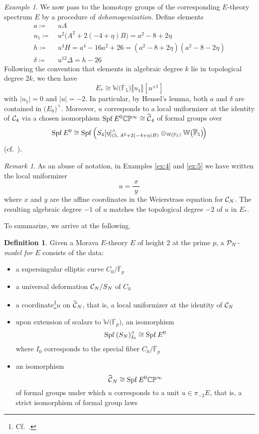 \documentclass{gtpart}
\theoremstyle{definition}
\newtheorem{defn}[equation]{Definition}
\theoremstyle{remark}
\newtheorem{rmk}[equation]{Remark}
\newtheorem{ex}[equation]{Example}
\newcommand{\mb}[1]{\mathbb{#1}}
\newcommand{\Spf}{{\rm Spf\thinspace}}
\newcommand{\cF}{\overline {\mb F}}
\newcommand{\CC}{{\cal C}}
\newcommand{\CP}{{\cal P}}
\newcommand{\BC}{{\mb C}}
\newcommand{\BF}{{\mb F}}
\newcommand{\BP}{{\mb P}}
\newcommand{\BW}{{\mb W}}
\newcommand{\HCC}{\widehat{~\!\!\CC}}
\renewcommand{\D}{\Delta}
\renewcommand{\d}{\delta}
\newcommand{\ce}{\coloneqq}
\newcommand{\lb}{\llbracket}
\newcommand{\rb}{\rrbracket}
\renewcommand{\=}{\approx}
\renewcommand{\-}{\sim}
\numberwithin{equation}{section}
\begin{document}
\begin{ex}
 We now pass to the homotopy groups of the corresponding $E$-theory spectrum $E$ 
 by a procedure of {\em dehomogenization}.  Define elements 
 \[
  \begin{split}
   a \ce & ~ u A \\
   u_1 \ce & ~ u^2 \big(A^2 + 2(-4 + \eta) B\big) = a^2 - 8 + 2 \eta \\
   h \ce & ~ u^4 H = a^4 - 16 a^2 + 26 
                   = (a^2 - 8 + 2 \eta) (a^2 - 8 - 2 \eta) \\
   \d \ce & ~ u^{12} \D = h - 26 
  \end{split}
 \]
 Following the convention that elements in algebraic degree $k$ lie in 
 topological degree $2 k$, we then have 
 \[
  E_* \cong \BW \big( \cF_5 \big) \lb u_1 \rb [u^{\pm 1}] 
 \]
 with $|u_1| = 0$ and $|u| = -2$.  In particular, by Hensel's lemma, both $a$ 
 and $\d$ are contained in $\big( E_0 \big)^{\!\times}$.  Moreover, $u$ 
 corresponds to a local uniformizer at the identity of $\CC_4$ via a chosen 
 isomorphism $\Spf E^0 \BC\BP^\infty \cong \HCC_4$ of formal groups over 
 \[
  \Spf E^0 \cong 
  \Spf\!\left( S_4[\eta]^\wedge_{\left(5, \, A^2 + 2 (-4 + \eta) B\right)} 
  \otimes_{\BW(\BF_5)} \BW \big( \cF_5 \big) \!\right) 
 \]
 (cf.~\cite[Definition 1.2]{AHS01}).  
\end{ex}

\begin{rmk}
 \label{rmk:abuse}
 As an abuse of notation, in Examples \ref{ex:4} and \ref{ex:5} we have written 
 the local uniformizer 
 \[
  u = \frac{~\!x~\!}{y} 
 \]
 where $x$ and $y$ are the affine coordinates in the Weierstrass equation for 
 $\CC_N$.  The resulting algebraic degree $-1$ of $u$ matches the topological 
 degree $-2$ of $u$ in $E_*$.  
\end{rmk}

To summarize, we arrive at the following.  

\begin{defn}
 \label{def:model}
 Given a Morava $E$-theory $E$ of height 2 at the prime $p$, a 
 {\em $\CP_N$-model for $E$} consists of the data: 
 \begin{itemize}
  \item a supersingular elliptic curve $C_0/\cF_p$ 

  \item a universal deformation $\CC_N/S_N$ of $C_0$ 

  \item a coordinate\footnote{Cf.~\cite[Definition 1.4]{Ando00}.  }$u$ on 
  $\HCC_N$, that is, a local uniformizer at the identity of $\CC_N$ 

  \item upon extension of scalars to $\BW \big( \cF_p \big)$, an isomorphism 
  \[
   \Spf (S_N)^\wedge_{I_0} \cong \Spf E^0 
  \]
  where $I_0$ corresponds to the special fiber $C_0/\cF_p$ 

  \item an isomorphism 
  \[
   \HCC_N \cong \Spf E^0 \BC\BP^\infty 
  \]
  of formal groups under which $u$ corresponds to a unit $u \in \pi_{-2} E$, 
  that is, a strict isomorphism of formal group laws 
 \end{itemize}
\end{defn}
\end{document}
